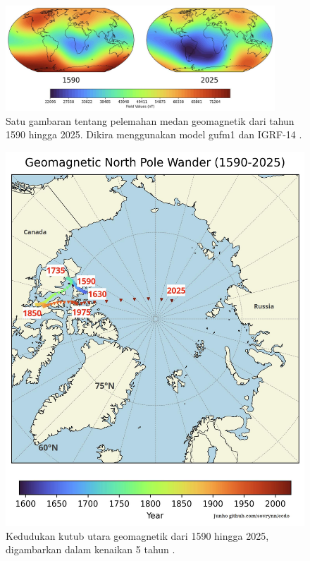 \documentclass[10pt,twocolumn,letterpaper]{article}
\begin{document}
\begin{figure}[t]
\begin{center}
\includegraphics[width=0.9\textwidth]{saa.jpg}
\end{center}
   \caption{Satu gambaran tentang pelemahan medan geomagnetik dari tahun 1590 hingga 2025. Dikira menggunakan model gufm1 dan IGRF-14 \cite{125,126}.}
\label{fig:14}
\end{figure}

\begin{figure}[t]
\begin{center}
   \includegraphics[width=1\linewidth]{npw.jpg}
\end{center}

   \caption{Kedudukan kutub utara geomagnetik dari 1590 hingga 2025, digambarkan dalam kenaikan 5 tahun \cite{142}.}
\label{fig:13}
\label{fig:onecol}
\end{figure}
\end{document}
